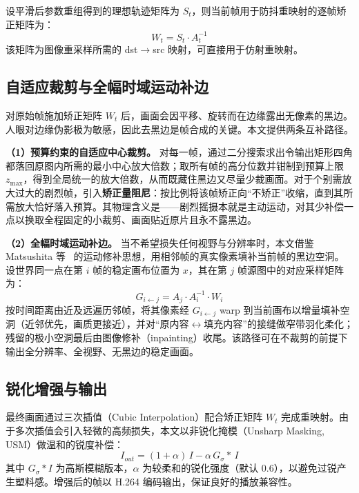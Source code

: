 \documentclass[10.5pt,twocolumn]{aaas}
\begin{document}
设平滑后参数重组得到的理想轨迹矩阵为 $S_t$，则当前帧用于防抖重映射的逐帧矫正矩阵为：
\begin{equation}
W_t = S_t \cdot A_t^{-1}
\end{equation}
该矩阵为图像重采样所需的 dst$\to$src 映射，可直接用于仿射重映射。

\subsection{自适应裁剪与全幅时域运动补边}
对原始帧施加矫正矩阵 $W_t$ 后，画面会因平移、旋转而在边缘露出无像素的黑边。人眼对边缘伪影极为敏感，因此去黑边是帧合成的关键。本文提供两条互补路径。

\textbf{（1）预算约束的自适应中心裁剪。} 对每一帧，通过二分搜索求出令输出矩形四角都落回原图内所需的最小中心放大倍数；取所有帧的高分位数并钳制到预算上限 $z_{\max}$，得到全局统一的放大倍数，从而既藏住黑边又尽量少裁画面。对于个别需放大过大的剧烈帧，引入\textbf{矫正量阻尼}：按比例将该帧矫正向“不矫正”收缩，直到其所需放大恰好落入预算。其物理含义是——剧烈摇摄本就是主动运动，对其少补偿一点以换取全程固定的小裁剪、画面贴近原片且永不露黑边。

\textbf{（2）全幅时域运动补边。} 当不希望损失任何视野与分辨率时，本文借鉴 Matsushita 等~\cite{matsushita2006} 的运动修补思想，用相邻帧的真实像素填补当前帧的黑边空洞。设世界同一点在第 $i$ 帧的稳定画布位置为 $x$，其在第 $j$ 帧源图中的对应采样矩阵为：
\begin{equation}
G_{i\leftarrow j} = A_j \cdot A_i^{-1} \cdot W_i
\end{equation}
按时间距离由近及远遍历邻帧，将其像素经 $G_{i\leftarrow j}$ warp 到当前画布以增量填补空洞（近邻优先，画质更接近），并对“原内容$\leftrightarrow$填充内容”的接缝做窄带羽化柔化；残留的极小空洞最后由图像修补（inpainting）收尾。该路径可在不裁剪的前提下输出全分辨率、全视野、无黑边的稳定画面。

\subsection{锐化增强与输出}
最终画面通过三次插值（Cubic Interpolation）配合矫正矩阵 $W_t$ 完成重映射。由于多次插值会引入轻微的高频损失，本文以非锐化掩模（Unsharp Masking, USM）做温和的锐度补偿：
\begin{equation}
I_{out} = (1+\alpha)\,I - \alpha\, G_{\sigma}\!*\,I
\end{equation}
其中 $G_{\sigma}*I$ 为高斯模糊版本，$\alpha$ 为较柔和的锐化强度（默认 0.6），以避免过锐产生塑料感。增强后的帧以 H.264 编码输出，保证良好的播放兼容性。
\end{document}
